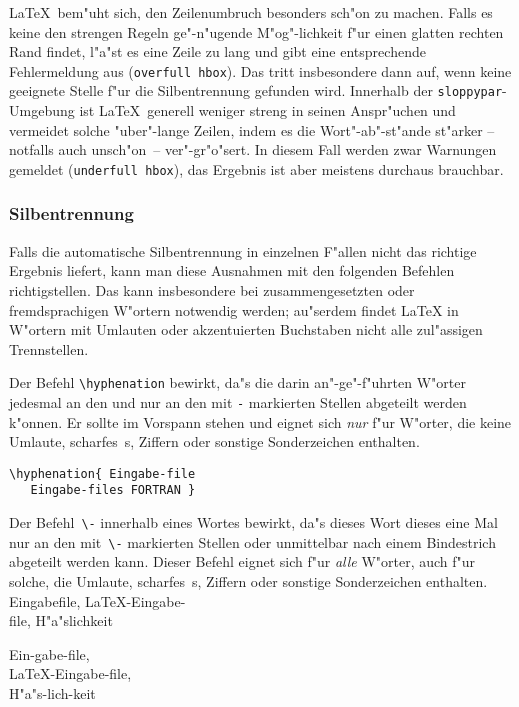 \LaTeX\ bem"uht sich, den Zeilenumbruch besonders sch"on zu
machen.  Falls es keine den strengen Regeln ge"-n"ugende
M"og"-lichkeit f"ur einen glatten rechten Rand findet, l"a"st es
eine Zeile zu lang und gibt eine entsprechende Fehlermeldung aus
(\texttt{over\-full hbox}).
Das tritt insbesondere dann auf, wenn keine geeignete Stelle
f"ur die Silbentrennung gefunden wird.
Innerhalb der \texttt{sloppypar}-Umgebung ist \LaTeX\ generell
weniger streng in seinen Anspr"uchen und vermeidet solche
"uber"-lange Zeilen, indem es die Wort"-ab"-st"ande st"arker --
notfalls auch un\-sch"on~-- ver"-gr"o"sert.
In diesem Fall werden zwar Warnungen gemeldet (\texttt{under\-full
hbox}), das Ergebnis ist aber meistens durchaus brauchbar.
 
 
\subsubsection{Silbentrennung} \label{silb}
 
Falls die automatische Silbentrennung in einzelnen F"allen nicht
das richtige Ergebnis liefert, kann man diese Ausnahmen mit den
folgenden Befehlen richtigstellen.
Das kann insbesondere bei zusammengesetzten oder fremdsprachigen
W"ortern notwendig werden; au"serdem findet \LaTeX{} in W"ortern
mit Umlauten oder akzentuierten Buchstaben nicht alle zul"assigen
Trennstellen.
 
Der Befehl \verb|\hyphenation| bewirkt, da"s die darin
an"-ge"-f"uhrten W"orter jedesmal an den und nur an den mit
\verb|-| markierten Stellen abgeteilt werden k"onnen.
Er sollte im Vorspann stehen und eignet sich
\emph{nur} f"ur W"orter, die keine Umlaute, scharfes~s,
Ziffern oder sonstige Sonderzeichen enthalten.
\exa
~
\exb
\begin{verbatim}
\hyphenation{ Eingabe-file
   Eingabe-files FORTRAN }
\end{verbatim}
\exc
 
Der Befehl~\verb|\-| innerhalb eines Wortes bewirkt, da"s dieses
Wort dieses eine Mal nur an den mit~\verb|\-|
markierten Stellen 
oder unmittelbar nach einem Bindestrich
abgeteilt werden kann.
Dieser Befehl eignet sich f"ur \emph{alle} W"orter, auch f"ur
solche, die Umlaute, scharfes~s, Ziffern oder sonstige
Sonderzeichen enthalten.
\exa
Ein\-gabe\-file, \LaTeX-Eingabe-\\
file, H"a"s\-lich\-keit
\exb
\begin{flushleft}\ttfamily
Ein\bs-gabe\bs-file,\\
\bs{}LaTeX-Eingabe\bs-file,\\
H"a"s\bs-lich\bs-keit
\end{flushleft}
\exc



